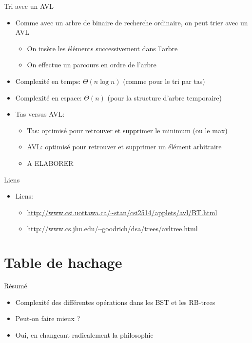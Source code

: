 \begin{frame}{Tri avec un AVL}

\begin{itemize}
\item Comme avec un arbre de binaire de recherche ordinaire, on peut trier avec un AVL
\begin{itemize}
\item On insère les éléments successivement dans l'arbre
\item On effectue un parcours en ordre de l'arbre
\end{itemize}
\item Complexité en temps: $\Theta(n\log n)$ (comme pour le tri par tas)
\item Complexité en espace: $\Theta(n)$ (pour la structure d'arbre temporaire)
\item Tas versus AVL:
\begin{itemize}
\item Tas: optimisé pour retrouver et supprimer le minimum (ou le max)
\item AVL: optimisé pour retrouver et supprimer un élément arbitraire 
\item A ELABORER
\end{itemize}
\end{itemize}

\end{frame}

\begin{frame}{Liens}
\begin{itemize}
\item Liens:
\begin{small}
\begin{itemize}
\item \url{http://www.csi.uottawa.ca/~stan/csi2514/applets/avl/BT.html}
\item \url{http://www.cs.jhu.edu/~goodrich/dsa/trees/avltree.html}
\end{itemize}
\end{small}
\end{itemize}
\end{frame}

\section{Table de hachage}

\begin{frame}{Résumé}
\begin{itemize}
\item Complexité des différentes opérations dans les BST et les RB-trees
\item Peut-on faire mieux ?
\item Oui, en changeant radicalement la philosophie
\end{itemize}

\end{frame}

